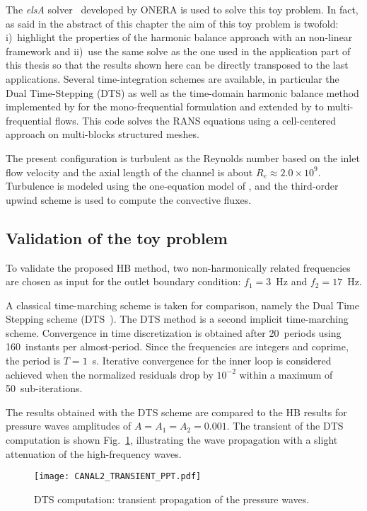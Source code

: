 The \emph{elsA} solver~\cite{Cambier2013} developed by ONERA
is used to solve this toy problem. In fact, as said in the
abstract of this chapter the aim of this toy problem is 
twofold: i)~highlight the properties of the harmonic balance
approach with an non-linear framework and ii)~use the same
solve as the one used in the application part of this
thesis so that the results shown here can be directly
transposed to the last applications. Several time-integration schemes
are available, in particular the Dual Time-Stepping (DTS)
as well as the time-domain harmonic 
balance method implemented by \citet{JSicot2008} for the mono-frequential
formulation and extended by \citet{JGuedeney2013} to multi-frequential flows. 
This code solves the RANS equations using a cell-centered
approach on multi-blocks structured meshes.

The present configuration is turbulent as the Reynolds number based on the
inlet flow velocity and the axial length of the channel is about $R_e
\approx 2.0 \times 10^9$.  Turbulence is modeled using the
one-equation model of \citet{Spalart1992}, and the
third-order upwind \citet{Roe1981} scheme is used to compute the
convective fluxes.


\subsection{Validation of the toy problem}
\label{sec:channel_multifreq}

To validate the proposed HB method, two non-harmonically related
frequencies are chosen as input for the outlet boundary condition:
$f_1 = 3$~Hz and $f_2 = 17$~Hz.

A classical time-marching scheme is taken for comparison, namely the
Dual Time Stepping scheme (DTS~\cite{Jameson1991}).  The DTS method is
a second implicit time-marching scheme.
Convergence in time discretization is obtained after 20~periods using
160~instants per almost-period. Since the frequencies are integers and
coprime, the period is $T=1$~s.  Iterative convergence for the
inner loop is considered achieved when the normalized residuals drop
by $10^{-2}$ within a maximum of 50~sub-iterations.

The results obtained with the DTS scheme are compared to the HB
results for pressure waves amplitudes of $A = A_1 = A_2 = 0.001$.  The
transient of the DTS computation is shown
Fig.~\ref{fig:canal2_transient}, illustrating the wave propagation
with a slight attenuation of the high-frequency waves.
\begin{figure}[htbp]
  \centering
  \texttt{[image: CANAL2\_TRANSIENT\_PPT.pdf]}
  \caption{DTS computation: transient propagation of the pressure waves.}
  \label{fig:canal2_transient}
\end{figure}


